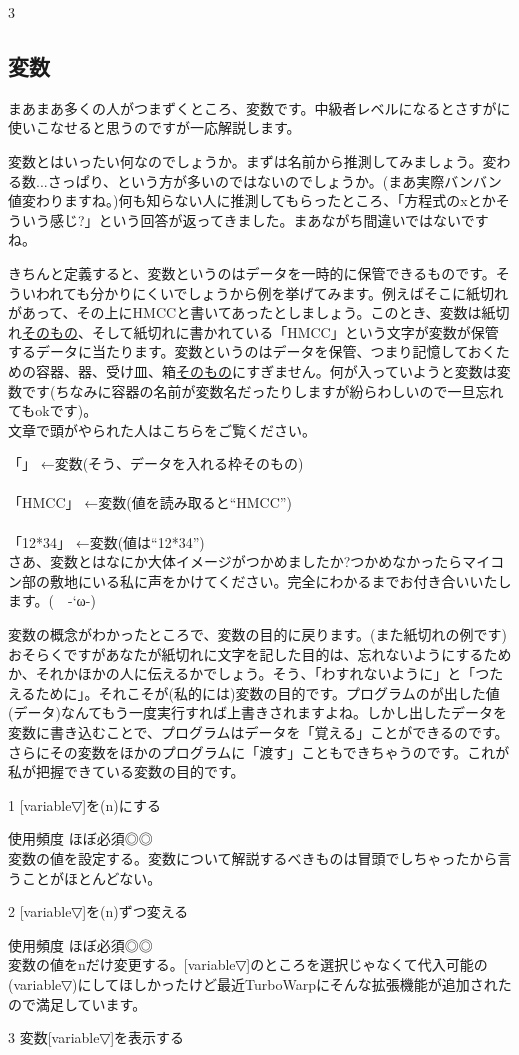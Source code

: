 \documentclass[b5paper,10pt]{jsarticle}
\begin{document}
\begin{multicols*}{3}
\subsection{変数}
まあまあ多くの人がつまずくところ、変数です。中級者レベルになるとさすがに使いこなせると思うのですが一応解説します。

変数とはいったい何なのでしょうか。まずは名前から推測してみましょう。変わる数...さっぱり、という方が多いのではないのでしょうか。(まあ実際バンバン値変わりますね。)何も知らない人に推測してもらったところ、「方程式のxとかそういう感じ?」という回答が返ってきました。まあながち間違いではないですね。

きちんと定義すると、変数というのはデータを一時的に保管できるものです。そういわれても分かりにくいでしょうから例を挙げてみます。例えばそこに紙切れがあって、その上にHMCCと書いてあったとしましょう。このとき、変数は紙切れ\underline{そのもの}、そして紙切れに書かれている「HMCC」という文字が変数が保管するデータに当たります。変数というのはデータを保管、つまり記憶しておくための容器、器、受け皿、箱\underline{そのもの}にすぎません。何が入っていようと変数は変数です(ちなみに容器の名前が変数名だったりしますが紛らわしいので一旦忘れてもokです)。\\ 
文章で頭がやられた人はこちらをご覧ください。

「」 ←変数(そう、データを入れる枠そのもの)\\
\\
「HMCC」 ←変数(値を読み取ると``HMCC'')\\
\\
「12*34」 ←変数(値は``12*34'')\\

さあ、変数とはなにか大体イメージがつかめましたか?つかめなかったらマイコン部の敷地にいる私に声をかけてください。完全にわかるまでお付き合いいたします。(　-`ω-)

変数の概念がわかったところで、変数の目的に戻ります。(また紙切れの例です)おそらくですがあなたが紙切れに文字を記した目的は、忘れないようにするためか、それかほかの人に伝えるかでしょう。そう、「わすれないように」と「つたえるために」。それこそが(私的には)変数の目的です。プログラムのが出した値(データ)なんてもう一度実行すれば上書きされますよね。しかし出したデータを変数に書き込むことで、プログラムはデータを「覚える」ことができるのです。さらにその変数をほかのプログラムに「渡す」こともできちゃうのです。これが私が把握できている変数の目的です。
\begin{itembox}{1}
[variable▽]を(n)にする
\end{itembox}
使用頻度 ほぼ必須◎◎\\
変数の値を設定する。変数について解説するべきものは冒頭でしちゃったから言うことがほとんどない。
\begin{itembox}{2}
[variable▽]を(n)ずつ変える
\end{itembox}
使用頻度 ほぼ必須◎◎\\
変数の値をnだけ変更する。[variable▽]のところを選択じゃなくて代入可能の(variable▽)にしてほしかったけど最近TurboWarpにそんな拡張機能が追加されたので満足しています。
\begin{itembox}{3}
変数[variable▽]を表示する


\end{itembox}
\end{multicols*}
\end{document}
